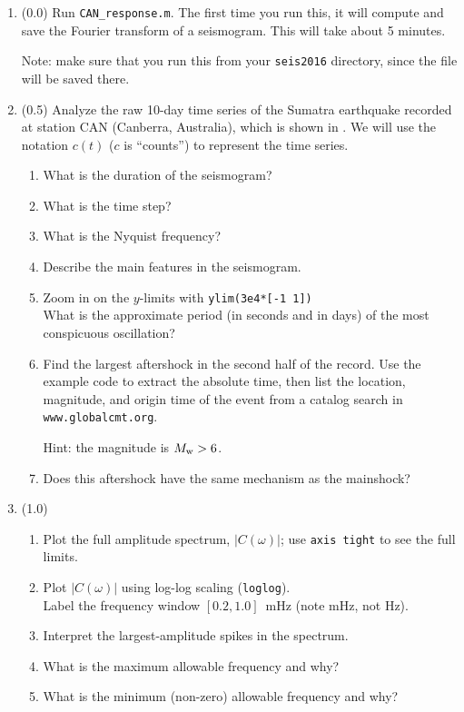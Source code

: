 \documentclass[11pt,titlepage,fleqn]{article}
\begin{document}
\begin{enumerate}

\item (0.0) Run \verb+CAN_response.m+. The first time you run this, it will compute and save the Fourier transform of a seismogram. This will take about 5 minutes.

Note: make sure that you run this from your \verb+seis2016+ directory, since the file will be saved there.


\item (0.5) Analyze the raw 10-day time series of the Sumatra earthquake recorded at station CAN (Canberra, Australia), which is shown in . We will use the notation $c(t)$ ($c$ is ``counts'') to represent the time series.

\begin{enumerate}
\item What is the duration of the seismogram?
\item What is the time step?
\item What is the Nyquist frequency?
\item Describe the main features in the seismogram.
\item Zoom in on the $y$-limits with \verb+ylim(3e4*[-1 1])+ \\
What is the approximate period (in seconds and in days) of the most conspicuous oscillation?
\item Find the largest aftershock in the second half of the record. Use the example code to extract the absolute time, then list the location, magnitude, and origin time of the event from a catalog search in \verb+www.globalcmt.org+.

Hint: the magnitude is $M_{\rm w} > 6$.

\item Does this aftershock have the same mechanism as the mainshock?
\end{enumerate}


\item (1.0)
\begin{enumerate}
\item Plot the full amplitude spectrum, $|C(\omega)|$; use \verb+axis tight+ to see the full limits.
\item Plot $|C(\omega)|$ using log-log scaling (\verb+loglog+). \\
Label the frequency window $[0.2,1.0]$~mHz (note mHz, not Hz). \\
\item Interpret the largest-amplitude spikes in the spectrum.
\item What is the maximum allowable frequency and why?
\item What is the minimum (non-zero) allowable frequency and why?
\end{enumerate}


\end{enumerate}
\end{document}
